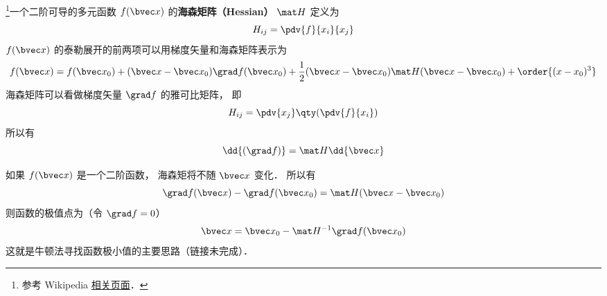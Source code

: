 
\begin{issues}
\issueDraft
\end{issues}


\footnote{参考 Wikipedia \href{https://en.wikipedia.org/wiki/Hessian_matrix}{相关页面}．}一个二阶可导的多元函数 $f(\bvec x)$ 的\textbf{海森矩阵（Hessian）} $\mat H$ 定义为
\begin{equation}
H_{ij} = \pdv{f}{x_i}{x_j}
\end{equation}
$f(\bvec x)$ 的泰勒展开的前两项可以用梯度矢量和海森矩阵表示为
\begin{equation}
f(\bvec x) = f(\bvec x_0) + (\bvec x - \bvec x_0) \grad f(\bvec x_0) + \frac12(\bvec x - \bvec x_0) \mat H (\bvec x - \bvec x_0) + \order{(x-x_0)^3}
\end{equation}
海森矩阵可以看做梯度矢量 $\grad f$ 的雅可比矩阵， 即
\begin{equation}
H_{ij} = \pdv{x_j} \qty(\pdv{f}{x_i})
\end{equation}
所以有
\begin{equation}
\dd{(\grad f)} = \mat H \dd{\bvec x}
\end{equation}

如果 $f(\bvec x)$ 是一个二阶函数， 海森矩将不随 $\bvec x$ 变化． 所以有
\begin{equation}
\grad f(\bvec x) - \grad f(\bvec x_0) = \mat H (\bvec x - \bvec x_0)
\end{equation}
则函数的极值点为（令 $\grad f = 0$）
\begin{equation}
\bvec x = \bvec x_0 - \mat H^{-1} \grad f(\bvec x_0)
\end{equation}
这就是牛顿法寻找函数极小值的主要思路（链接未完成）．
